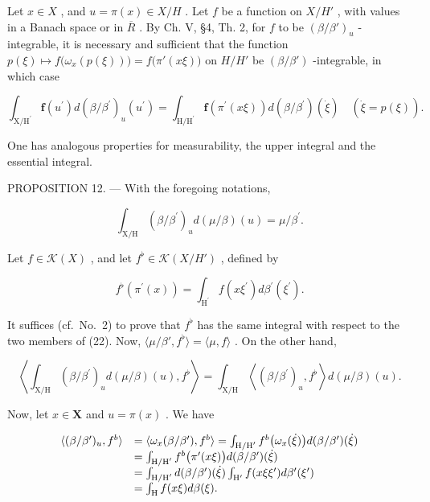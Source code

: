 Let \(x \in X\) , and \(u = \pi(x) \in X/H\) . Let \(f\) be a function on \(X/H'\) , with values in a Banach space or in \(\overline{R}\) . By Ch. V, §4, Th. 2, for \(f\) to be \((\beta/\beta')_u\) -integrable, it is necessary and sufficient that the function \(p(\xi) \mapsto f\big(\omega_x(p(\xi))\big) = f\big(\pi'(x\xi)\big)\) on \(H/H'\) be \((\beta/\beta')\) -integrable, in which case

\[
\int_ {\mathrm{X} / \mathrm{H} ^ {\prime}} \mathbf {f} (u ^ {\prime}) d (\beta / \beta^ {\prime}) _ {u} (u ^ {\prime}) = \int_ {\mathrm{H} / \mathrm{H} ^ {\prime}} \mathbf {f} \left(\pi^ {\prime} (x \xi)\right) d (\beta / \beta^ {\prime}) (\dot {\xi}) \quad \left(\dot {\xi} = p (\xi)\right).\tag{21}
\]

One has analogous properties for measurability, the upper integral and the essential integral.

PROPOSITION 12. --- With the foregoing notations,

\[
\int_ {\mathrm{X/H}} (\beta / \beta^ {\prime}) _ {u} d (\mu / \beta) (u) = \mu / \beta^ {\prime}.\tag{22}
\]

Let \(f \in \mathcal{K}(X)\) , and let \(f^{\flat} \in \mathcal{K}(X/H')\) , defined by

\[
f ^ {\flat} \left(\pi^ {\prime} (x)\right) = \int_ {\mathrm{H} ^ {\prime}} f \left(x \xi^ {\prime}\right) d \beta^ {\prime} \left(\xi^ {\prime}\right).
\]

It suffices (cf.~No.~2) to prove that \(f^{\flat}\) has the same integral with respect to the two members of (22). Now, \(\langle \mu / \beta', f^{\flat} \rangle = \langle \mu, f \rangle\) . On the other hand,

\[
\left\langle \int_ {\mathrm{X} / \mathrm{H}} \left(\beta / \beta^ {\prime}\right) _ {u} d (\mu / \beta) (u), f ^ {\flat} \right\rangle = \int_ {\mathrm{X} / \mathrm{H}} \left\langle \left(\beta / \beta^ {\prime}\right) _ {u}, f ^ {\flat} \right\rangle d (\mu / \beta) (u).
\]

Now, let \(x \in \mathbf{X}\) and \(u = \pi(x)\) . We have

\[
\begin{array}{r l} \langle (\beta / \beta^ {\prime}) _ {u}, f ^ {b} \rangle & = \langle \omega_ {x} (\beta / \beta^ {\prime}), f ^ {b} \rangle = \int_ {\mathrm{H/H} ^ {\prime}} f ^ {b} \big (\omega_ {x} (\dot {\xi}) \big) d (\beta / \beta^ {\prime}) (\dot {\xi}) \\ & = \int_ {\mathrm{H/H} ^ {\prime}} f ^ {b} \big (\pi^ {\prime} (x \xi) \big) d (\beta / \beta^ {\prime}) (\dot {\xi}) \\ & = \int_ {\mathrm{H/H} ^ {\prime}} d (\beta / \beta^ {\prime}) (\dot {\xi}) \int_ {\mathrm{H} ^ {\prime}} f (x \xi \xi^ {\prime}) d \beta^ {\prime} (\xi^ {\prime}) \\ & = \int_ {\mathrm{H}} f (x \xi) d \beta (\xi). \end{array}
\]

